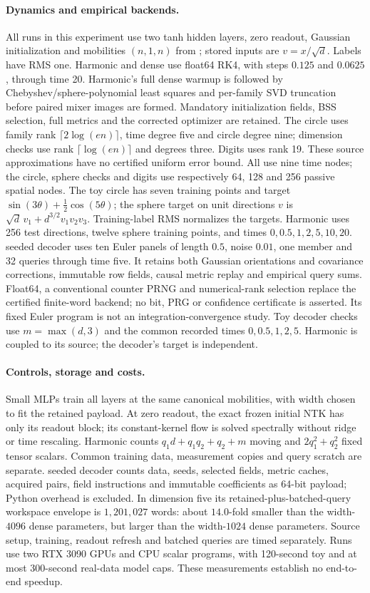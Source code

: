 \paragraph{Dynamics and empirical backends.}
All runs in this experiment use two tanh hidden layers, zero readout, Gaussian
initialization and mobilities $(n,1,n)$ from ; stored
inputs are $v=x/\sqrt d$. Labels have RMS one. Harmonic and dense use
float64 RK4, with steps $0.125$ and $0.0625$, through time 20. Harmonic's
full dense warmup is followed by Chebyshev/sphere-polynomial least squares
and per-family SVD truncation before paired mixer images are formed.
Mandatory initialization fields, BSS selection, full metrics and the
corrected optimizer are retained. The circle uses family rank
$\lceil2\log(en)\rceil$, time degree five and circle degree nine;
dimension checks use rank $\lceil\log(en)\rceil$ and degrees three.
Digits uses rank 19. These source approximations have no certified
uniform error bound. All use nine time nodes; the circle, sphere checks
and digits use respectively 64, 128 and 256 passive spatial nodes.
The toy circle has seven training points and target
$\sin(3\theta)+\tfrac12\cos(5\theta)$; the sphere target on unit
directions $v$ is $\sqrt d\,v_1+d^{3/2}v_1v_2v_3$.
Training-label RMS normalizes the targets. Harmonic uses 256 test directions,
twelve sphere training points, and times $0,0.5,1,2,5,10,20$.
seeded decoder uses ten Euler panels of length $0.5$,
noise $0.01$, one member and 32 queries through time five. It retains
both Gaussian orientations and covariance corrections, immutable row
fields, causal metric replay and empirical query sums. Float64, a
conventional counter PRNG and numerical-rank selection replace the
certified finite-word backend; no bit, PRG or confidence certificate
is asserted. Its fixed Euler program is not an integration-convergence
study. Toy decoder checks use $m=\max(d,3)$ and the common recorded times
$0,0.5,1,2,5$. Harmonic is coupled to its source; the decoder's target is independent.

\paragraph{Controls, storage and costs.}
Small MLPs train all layers at the same canonical mobilities, with width
chosen to fit the retained payload. At zero readout, the exact frozen
initial NTK has only its readout block; its constant-kernel flow is solved
spectrally without ridge or time rescaling. Harmonic counts
$q_1d+q_1q_2+q_2+m$ moving and $2q_1^2+q_2^2$ fixed tensor scalars.
Common training data, measurement copies and query scratch are separate.
seeded decoder counts data, seeds, selected fields, metric caches, acquired
pairs, field instructions and immutable coefficients as 64-bit payload;
Python overhead is excluded. In dimension five its retained-plus-batched-query
workspace envelope is $1{,}201{,}027$ words: about $14.0$-fold smaller
than the width-$4096$ dense parameters, but larger than the width-$1024$
dense parameters. Source setup, training, readout refresh and batched
queries are timed separately. Runs use two RTX 3090 GPUs and CPU scalar
programs, with 120-second toy and at most 300-second real-data model caps.
These measurements establish no end-to-end speedup.


